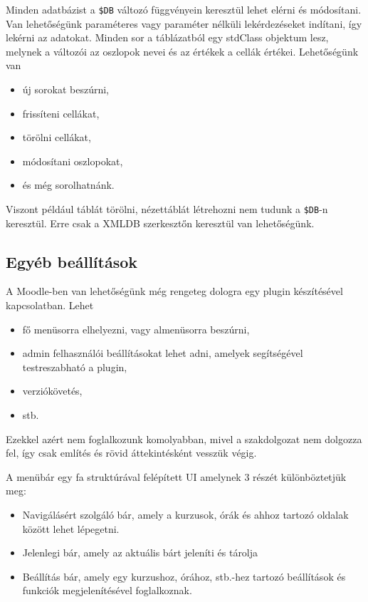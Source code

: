 Minden adatbázist a \texttt{\$DB} változó függvényein keresztül lehet elérni és módosítani. Van lehetőségünk paraméteres vagy paraméter nélküli lekérdezéseket indítani, így lekérni az adatokat. Minden sor a táblázatból egy stdClass objektum lesz, melynek a változói az oszlopok nevei és az értékek a cellák értékei. Lehetőségünk van 
\begin{itemize}
    \item új sorokat beszúrni,
    \item frissíteni cellákat,
    \item törölni cellákat,
    \item módosítani oszlopokat,
    \item és még sorolhatnánk.
\end{itemize}

Viszont például táblát törölni, nézettáblát létrehozni nem tudunk a \texttt{\$DB}-n keresztül. Erre csak a XMLDB szerkesztőn keresztül van lehetőségünk. 

\subsection{Egyéb beállítások}

A Moodle-ben van lehetőségünk még rengeteg dologra egy plugin készítésével kapcsolatban. Lehet
\begin{itemize}
    \item fő menüsorra elhelyezni, vagy almenüsorra beszúrni,
    \item admin felhasználói beállításokat lehet adni, amelyek segítségével testreszabható a plugin,
    \item verziókövetés, 
    \item stb.
\end{itemize}

Ezekkel azért nem foglalkozunk komolyabban, mivel a szakdolgozat nem dolgozza fel, így csak említés és rövid áttekintésként vesszük végig. \par

A menübár egy fa struktúrával felépített UI amelynek 3 részét különböztetjük meg:
\begin{itemize}
    \item Navigálásért szolgáló bár, amely a kurzusok, órák és ahhoz tartozó oldalak között lehet lépegetni.
    \item Jelenlegi bár, amely az aktuális bárt jeleníti és tárolja
    \item Beállítás bár, amely egy kurzushoz, órához, stb.-hez tartozó beállítások és funkciók megjelenítésével foglalkoznak.
\end{itemize}

